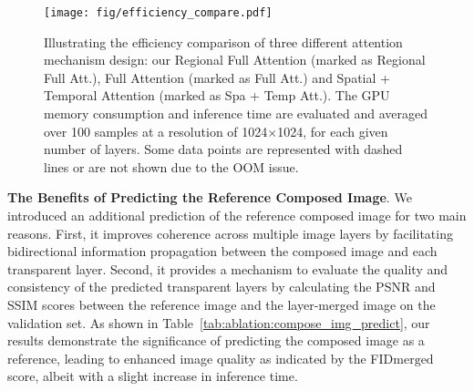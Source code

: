 \begin{figure}[!t]
\begin{minipage}[!t]{1\linewidth}
\centering
\texttt{[image: fig/efficiency\_compare.pdf]}
\end{minipage}
\vspace{-2mm}
\caption{\footnotesize{
Illustrating the efficiency comparison of three different attention mechanism design: our Regional Full Attention (marked as Regional Full Att.), Full Attention (marked as Full Att.) and Spatial + Temporal Attention (marked as Spa + Temp Att.). The GPU memory consumption and inference time are evaluated and averaged over 100 samples at a resolution of 1024$\times$1024, for each given number of layers. Some data points are represented with dashed lines or are not shown due to the OOM issue.
}}
\label{fig:efficiency}
\vspace{-2mm}
\end{figure}

\vspace{1mm}
\noindent\textbf{The Benefits of Predicting the Reference Composed Image}. We introduced an additional prediction of the reference composed image for two main reasons. First, it improves coherence across multiple image layers by facilitating bidirectional information propagation between the composed image and each transparent layer. Second, it provides a mechanism to evaluate the quality and consistency of the predicted transparent layers by calculating the PSNR and SSIM scores between the reference image and the layer-merged image on the validation set. As shown in Table~\ref{tab:ablation:compose_img_predict}, our results demonstrate the significance of predicting the composed image as a reference, leading to enhanced image quality as indicated by the FID$\scriptstyle \text{merged}$ score, albeit with a slight increase in inference time.


